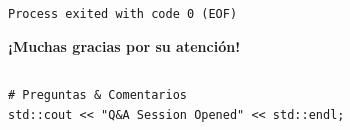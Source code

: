 \documentclass[10pt, aspectratio=169]{beamer}
\begin{document}
\begin{frame}[c]
  \centering
  \vspace{1cm}

  \begin{block}{}
    \centering
    \Large \texttt{Process exited with code 0 (EOF)}
  \end{block}

  \vspace{0.8cm}

  {\Huge \textbf{¡Muchas gracias por su atención!}}

  \vspace{0.8cm}

  \begin{columns}
    \centering
    \small
    \texttt{\# Preguntas \& Comentarios}\\
    \texttt{std::cout << "Q\&A Session Opened" << std::endl;}
  \end{columns}
\end{frame}
\end{document}
